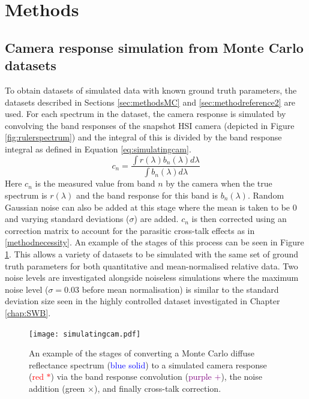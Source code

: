 \section{Methods}
\subsection{Camera response simulation from Monte Carlo datasets}\label{sec:MCcameras}
To obtain datasets of simulated data with known ground truth parameters, the datasets described in Sections \ref{sec:methodsMC} and \ref{sec:methodreference2} are used. For each spectrum in the dataset, the camera response is simulated by convolving the band responses of the snapshot HSI camera (depicted in Figure \ref{fig:rulerspectrum}) and the integral of this is divided by the band response integral as defined in Equation \ref{eq:simulatingcam}. 
\begin{equation}
	c_{n} = \frac{\int r(\lambda)b_n(\lambda) d\lambda}{\int b_n(\lambda) d\lambda}
\label{eq:simulatingcam}
\end{equation}
Here $c_n$ is the measured value from band $n$ by the camera when the true spectrum is $r(\lambda)$ and the band response for this band is $b_n(\lambda)$. Random Gaussian noise can also be added at this stage where the mean is taken to be 0 and varying standard deviations ($\sigma$) are added. $c_n$ is then corrected using an correction matrix to account for the parasitic cross-talk effects as in \ref{methodnecessity}. An example of the stages of this process can be seen in Figure \ref{fig:simulatingcam}. This allows a variety of datasets to be simulated with the same set of ground truth parameters for both quantitative and mean-normalised relative data. Two noise levels are investigated alongside noiseless simulations where the maximum noise level ($\sigma = 0.03$ before mean normalisation) is similar to the standard deviation size seen in the highly controlled dataset investigated in Chapter \ref{chap:SWB}.  
\begin{figure}[h!]
    \centering 
    \texttt{[image: simulatingcam.pdf]}
    \caption{An example of the stages of converting a Monte Carlo diffuse reflectance spectrum (\textcolor{blue}{blue solid}) to a simulated camera response (\textcolor{red}{red $*$}) via the band response convolution (\textcolor{purple}{purple $+$}), the noise addition (\textcolor{MyGreen}{green $\times$}), and finally cross-talk correction.}
    \label{fig:simulatingcam}
\end{figure}

